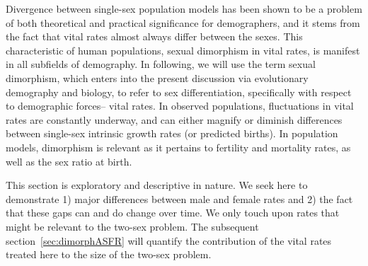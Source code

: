  \FloatBarrier
Divergence between single-sex population models has been shown to be a problem
of both theoretical and practical significance for demographers, and it stems from
the fact that vital rates almost always differ between the sexes.
This characteristic of human populations, sexual dimorphism in vital rates,
is manifest in all subfields of demography. In following, we will use the term
sexual dimorphism, which enters into the present discussion via evolutionary
demography and biology, to refer to sex differentiation, specifically with
respect to demographic forces-- vital rates. In observed populations,
fluctuations in vital rates are constantly underway, and can either magnify or 
diminish differences between single-sex intrinsic growth rates (or predicted births). 
In population models, dimorphism is relevant as it pertains to fertility and mortality 
rates, as well as the sex ratio at birth.

This section is exploratory and descriptive in nature. We seek here to
demonstrate 1) major differences between male and female rates and 2) the fact
that these gaps can and do change over time. We only touch upon rates that might
be relevant to the two-sex problem. The subsequent section~\ref{sec:dimorphASFR}
will quantify the contribution of the vital rates treated here to the size of the two-sex
problem.
